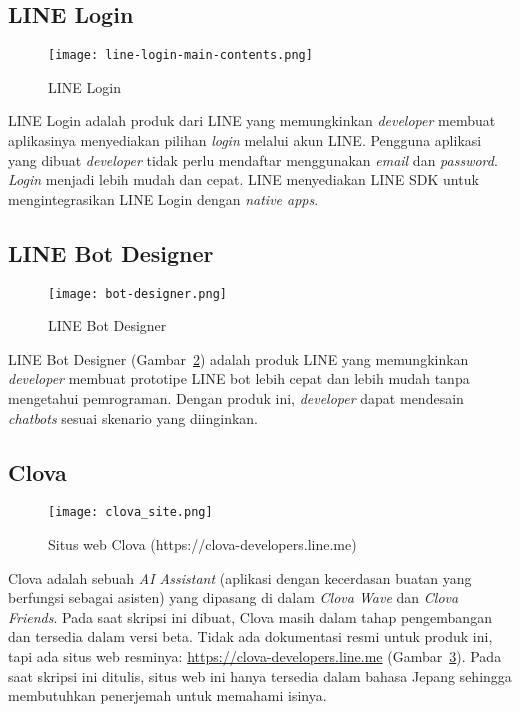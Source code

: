 \subsection{LINE Login}

\begin{figure}[H]
	\centering  
	\texttt{[image: line-login-main-contents.png]}  
	\caption[LINE Login]{LINE Login} 
	\label{fig:line-login} 
\end{figure}

LINE Login adalah produk dari LINE yang memungkinkan \textit{developer} membuat aplikasinya menyediakan pilihan \textit{login} melalui akun LINE. Pengguna aplikasi yang dibuat \textit{developer} tidak perlu mendaftar menggunakan \textit{email} dan \textit{password}. \textit{Login} menjadi lebih mudah dan cepat. LINE menyediakan LINE SDK untuk mengintegrasikan LINE Login dengan \textit{native apps}.

\subsection{LINE Bot Designer}

\begin{figure}[H]
	\centering  
	\texttt{[image: bot-designer.png]}  
	\caption[LINE Bot Designer]{LINE Bot Designer} 
	\label{fig:bot-designer} 
\end{figure}

LINE Bot Designer (Gambar~\ref{fig:bot-designer}) adalah produk LINE yang memungkinkan \textit{developer} membuat prototipe LINE bot lebih cepat dan lebih mudah tanpa mengetahui pemrograman. Dengan produk ini, \textit{developer} dapat mendesain \textit{chatbots} sesuai skenario yang diinginkan.

\subsection{Clova}

\begin{figure}[H]
	\centering  
	\texttt{[image: clova\_site.png]}  
	\caption[Situs web Clova]{Situs web Clova (https://clova-developers.line.me)} 
	\label{fig:clova_site} 
\end{figure}

Clova adalah sebuah\textit{ AI Assistant} (aplikasi dengan kecerdasan buatan yang berfungsi sebagai asisten) yang dipasang di dalam \textit{Clova Wave} dan \textit{Clova Friends}. Pada saat skripsi ini dibuat, Clova masih dalam tahap pengembangan dan tersedia dalam versi beta. Tidak ada dokumentasi resmi untuk produk ini, tapi ada situs web resminya: \url{https://clova-developers.line.me} (Gambar~\ref{fig:clova_site}). Pada saat skripsi ini ditulis, situs web ini hanya tersedia dalam bahasa Jepang sehingga membutuhkan penerjemah untuk memahami isinya.

